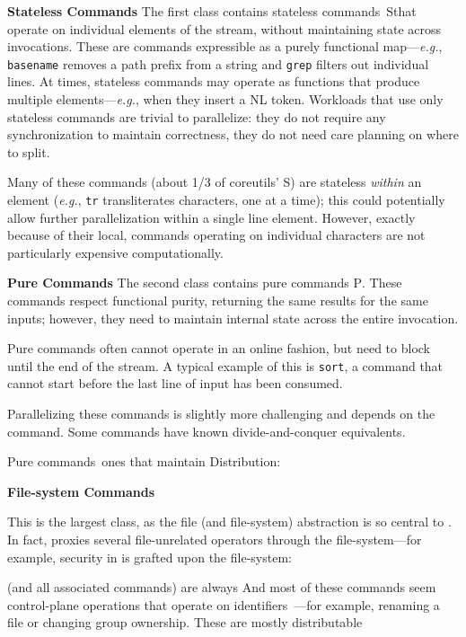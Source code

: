 \documentclass[sigplan,10pt,review,anonymous]{acmart}
\newcommand{\eg}{{\em e.g.}, }
\newcommand{\heading}[1]{\vspace{4pt}\noindent\textbf{#1}\enspace}
\newcommand{\ttt}[1]{\texttt{\small #1}}
\newcommand{\cn}[1]{\mbox{\textcircled{\footnotesize #1}}}
\newcommand{\pur}{\cn{\textsc{P}}}
\newcommand{\sta}{\cn{\textsc{S}}}
\begin{document}

\heading{Stateless Commands}
The first class contains stateless commands~\sta that operate on individual elements of the stream, without maintaining state across invocations.
These are commands expressible as a purely functional map---\eg \ttt{basename} removes a path prefix from a string and \ttt{grep} filters out individual lines.
At times, stateless commands may operate as functions that produce multiple elements---\eg when they insert a {\sc NL} token.
Workloads that use only stateless commands are trivial to parallelize:
  they do not require any synchronization to maintain correctness,
  they do not need care planning on where to split.

Many of these commands (about 1/3 of coreutils' \sta) are stateless \emph{within} an element (\eg \ttt{tr} transliterates characters, one at a time);
  this could potentially allow further parallelization within a single line element.
However, exactly because of their local, commands operating on individual characters are not particularly expensive computationally.

\heading{Pure Commands}
The second class contains pure commands \pur.
These commands respect functional purity, returning the same results for the same inputs;
  however, they need to maintain internal state across the entire invocation.

Pure commands often cannot operate in an online fashion, but need to block until the end of the stream.
A typical example of this is \ttt{sort}, a command that cannot start before the last line of input has been consumed.

Parallelizing these commands is slightly more challenging and depends on the command.
Some commands have known divide-and-conquer equivalents.

Pure commands~ones that maintain 
Distribution:

\heading{File-system Commands}

This is the largest class, as the file (and file-system) abstraction is so central to \unix.
In fact, \unix proxies several file-unrelated operators through the file-system---for example, security in \unix is grafted upon the file-system: 

(and all associated commands) are always
And most of these commands seem control-plane operations that operate on identifiers~---for example, renaming a file or changing group ownership.
These are mostly distributable
\end{document}
